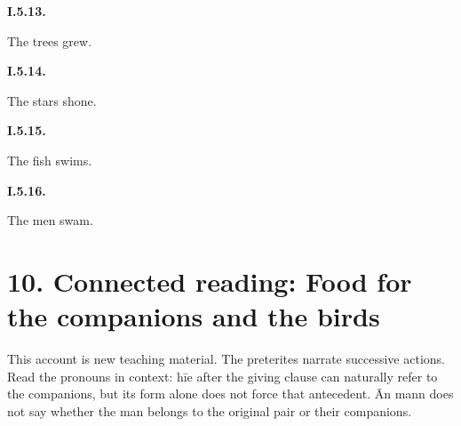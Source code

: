 \par\begin{minipage}{\linewidth}\raggedright
\textbf{I.5.13.}

The trees grew.

\end{minipage}\par\addvspace{4pt}

\par\begin{minipage}{\linewidth}\raggedright
\textbf{I.5.14.}

The stars shone.

\end{minipage}\par\addvspace{4pt}

\par\begin{minipage}{\linewidth}\raggedright
\textbf{I.5.15.}

The fish swims.

\end{minipage}\par\addvspace{4pt}

\par\begin{minipage}{\linewidth}\raggedright
\textbf{I.5.16.}

The men swam.

\end{minipage}\par\addvspace{4pt}

\section*{10. Connected reading: Food for the companions and the birds}

This account is new teaching material. The preterites narrate successive actions. Read the pronouns in context: hīe after the giving clause can naturally refer to the companions, but its form alone does not force that antecedent. Ān mann does not say whether the man belongs to the original pair or their companions.

